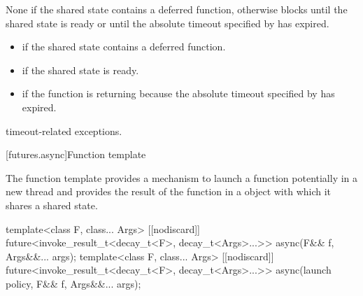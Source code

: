 \begin{itemdescr}
\pnum
\effects
None if the shared state contains a deferred function,
otherwise
blocks until the shared state is ready or until the
absolute timeout specified by
 has expired.

\pnum
\returns

\begin{itemize}
\item {} if the shared state contains a deferred
function.

\item {} if the shared state is ready.

\item {} if the function is returning because the
absolute timeout
specified by  has expired.
\end{itemize}

\pnum
\throws
timeout-related exceptions.
\end{itemdescr}

[futures.async]{Function template }

\pnum
The function template  provides a mechanism to launch a function potentially
in a new thread and provides the result of the function in a  object with which
it shares a shared state.

%
\begin{itemdecl}
template<class F, class... Args>
  [[nodiscard]] future<invoke_result_t<decay_t<F>, decay_t<Args>...>>
    async(F&& f, Args&&... args);
template<class F, class... Args>
  [[nodiscard]] future<invoke_result_t<decay_t<F>, decay_t<Args>...>>
    async(launch policy, F&& f, Args&&... args);
\end{itemdecl}


